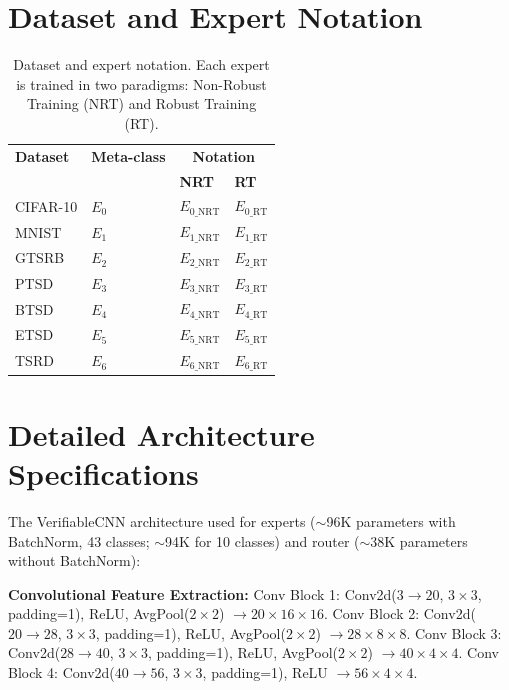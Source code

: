 \documentclass[runningheads]{llncs}
\begin{document}
\appendix

\section{Dataset and Expert Notation}
\label{app:notation}

\begin{table}[H]
\centering
\caption{Dataset and expert notation. Each expert is trained in two paradigms: Non-Robust Training (NRT) and Robust Training (RT).}
\label{tab:notation}
\begin{tabular}{llll}
\toprule
\textbf{Dataset} & \textbf{Meta-class} & \multicolumn{2}{c}{\textbf{Notation}} \\
 & & \textbf{NRT} & \textbf{RT} \\
\midrule
CIFAR-10 & $E_0$ & $E_{0\_\text{NRT}}$ & $E_{0\_\text{RT}}$ \\
MNIST & $E_1$ & $E_{1\_\text{NRT}}$ & $E_{1\_\text{RT}}$ \\
GTSRB & $E_2$ & $E_{2\_\text{NRT}}$ & $E_{2\_\text{RT}}$ \\
PTSD & $E_3$ & $E_{3\_\text{NRT}}$ & $E_{3\_\text{RT}}$ \\
BTSD & $E_4$ & $E_{4\_\text{NRT}}$ & $E_{4\_\text{RT}}$ \\
ETSD & $E_5$ & $E_{5\_\text{NRT}}$ & $E_{5\_\text{RT}}$ \\
TSRD & $E_6$ & $E_{6\_\text{NRT}}$ & $E_{6\_\text{RT}}$ \\
\bottomrule
\end{tabular}
\end{table}

\section{Detailed Architecture Specifications}
\label{app:architecture}

The VerifiableCNN architecture used for experts (${\sim}$96K parameters with BatchNorm, 43 classes; ${\sim}$94K for 10 classes) and router (${\sim}$38K parameters without BatchNorm):

\textbf{Convolutional Feature Extraction:}
Conv Block 1: Conv2d($3 \to 20$, $3 \times 3$, padding=1), ReLU, AvgPool($2 \times 2$) $\to 20 \times 16 \times 16$.
Conv Block 2: Conv2d($20 \to 28$, $3 \times 3$, padding=1), ReLU, AvgPool($2 \times 2$) $\to 28 \times 8 \times 8$.
Conv Block 3: Conv2d($28 \to 40$, $3 \times 3$, padding=1), ReLU, AvgPool($2 \times 2$) $\to 40 \times 4 \times 4$.
Conv Block 4: Conv2d($40 \to 56$, $3 \times 3$, padding=1), ReLU $\to 56 \times 4 \times 4$.
\end{document}
